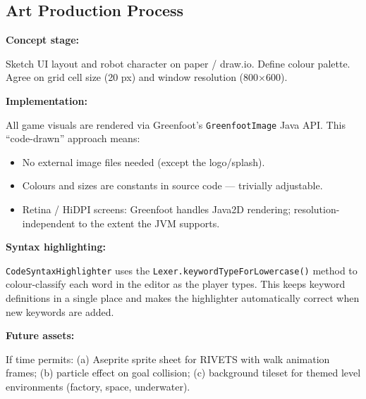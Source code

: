 \documentclass[12pt,a4paper]{article}
\newcommand{\gddfield}[2]{%
  \noindent\begin{minipage}[t]{3.5cm}\bfseries\color{accent}\sffamily#1\end{minipage}%
  \hspace{8pt}%
  \begin{minipage}[t]{\dimexpr\linewidth-3.5cm-8pt\relax}%
    #2
  \end{minipage}\par\smallskip}
\begin{document}
\begin{center}
\end{center}

\subsection{Art Production Process}

\begin{tcolorbox}[gddbox, title={Art Process}]
\gddfield{Concept stage:}{Sketch UI layout and robot character on paper / draw.io. Define colour palette. Agree on grid cell size (20 px) and window resolution (800$\times$600).}
\gddfield{Implementation:}{All game visuals are rendered via Greenfoot's \texttt{GreenfootImage} Java API. This ``code-drawn'' approach means:
\begin{itemize}[noitemsep]
  \item No external image files needed (except the logo/splash).
  \item Colours and sizes are constants in source code — trivially adjustable.
  \item Retina / HiDPI screens: Greenfoot handles Java2D rendering; resolution-independent to the extent the JVM supports.
\end{itemize}
}
\gddfield{Syntax highlighting:}{\texttt{CodeSyntaxHighlighter} uses the \texttt{Lexer.keywordTypeForLowercase()} method to colour-classify each word in the editor as the player types. This keeps keyword definitions in a single place and makes the highlighter automatically correct when new keywords are added.}
\gddfield{Future assets:}{If time permits: (a) Aseprite sprite sheet for RIVETS with walk animation frames; (b) particle effect on goal collision; (c) background tileset for themed level environments (factory, space, underwater).}
\end{tcolorbox}
\end{document}
